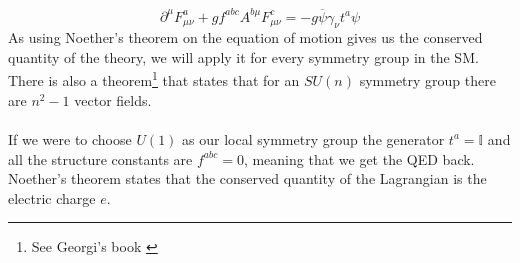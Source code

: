 \documentclass[12pt, a4paper]{book}
\begin{document}
\begin{equation}\label{eq:YM_eq}
    \partial^\mu F^a_{\mu\nu} +gf^{abc}A^{b\mu}F^c_{\mu\nu} = -g\overline{\psi}\gamma_\nu t^a\psi
\end{equation}
As using Noether's theorem on the equation of motion gives us the conserved quantity of the theory, we will apply it for every symmetry group in the SM. There is also a theorem\footnote{See Georgi's book \cite{Georgi:1982jb}} that states that for an $SU(n)$ symmetry group there are $n^2-1$ vector fields.\\
\\If we were to choose $U(1)$ as our local symmetry group the generator $t^a = \mathbb{I}$ and all the structure constants are $f^{abc}=0$, meaning that we get the QED back. 
Noether's theorem states that the conserved quantity of the Lagrangian is the electric charge $e$.
\end{document}

